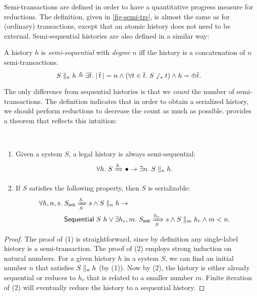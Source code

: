 \documentclass[sigplan,10pt,review,anonymous,screen]{acmart}\settopmatter{printfolios=true,printccs=false,printacmref=false}
\begin{document}
Semi-transactions are defined in order to have a quantitative progress measure for reductions.
The definition, given in \autoref{fig-semi-trs}, is almost the same as for (ordinary) transactions, except that an atomic history does not need to be external.
Semi-sequential histories are also defined in a similar way:
\begin{definition}
  A history $h$ is \emph{semi-sequential} with \emph{degree} $n$ iff the history
  is a concatenation of $n$ semi-transactions.
  \begin{displaymath}
    \hsseq{S}{h}{n} \triangleq \exists \listof{t}.\; \sizeof{\listof{t}} = n \wedge (\forall t \in \listof{t}.\; \strsn{S}{t}) \wedge h = \listconcat{\listof{t}}.
  \end{displaymath}
\end{definition}

The only difference from sequential histories is that we \emph{count} the number of semi-transactions.
The definition indicates that in order to obtain a serialized history, we should perform reductions to decrease the count as much as possible.
\hemiola{} provides a theorem that reflects this intuition:
\begin{theorem}\label{thm-sseq-sz}\mbox{}\\
  \begin{enumerate}
  \item Given a system $S$, a legal history is always semi-sequential:
    \begin{displaymath}
      \forall h.\; \semleg{S}{h} \to \exists n.\; \hsseq{S}{h}{n}.
    \end{displaymath}
  \item If $S$ satisfies the following property, then $S$ is serializable:
    \begin{align*}
      \forall h, n, s.\; & \semsteps{S}{\sysInit{S}}{h}{s} \land \hsseq{S}{h}{n} \to \\
      & \hseq{S}{h} \vee \exists h_r, m.\; \semsteps{S}{\sysInit{S}}{h_r}{s}
      \wedge \hsseq{S}{h_r}{m} \wedge m < n.
    \end{align*}
  \end{enumerate}
\end{theorem}
\begin{proof}
  The proof of (1) is straightforward, since by definition any single-label history is a semi-transaction.
  The proof of (2) employs strong induction on natural numbers.
  For a given history $h$ in a system $S$, we can find an initial number $n$ that satisfies $\hsseq{S}{h}{n}$ (by (1)).
  Now by (2), the history is either already sequential or reduces to $h_r$ that is related to a smaller number $m$.
  Finite iteration of (2) will eventually reduce the history to a sequential history.
\end{proof}
\end{document}
